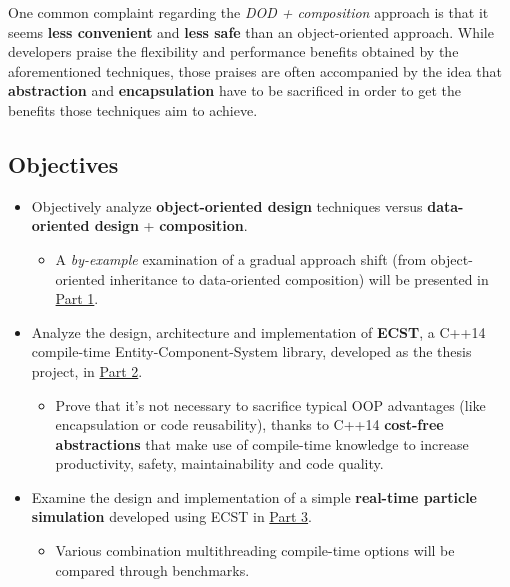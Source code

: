 \documentclass[oneside, 12pt, a4paper, openany]{book}
\providecommand{\tightlist}{%
  \setlength{\itemsep}{0pt}\setlength{\parskip}{0pt}}
\begin{document}
One common complaint regarding the \emph{DOD + composition} approach is
that it seems \textbf{less convenient} and \textbf{less safe} than an
object-oriented approach. While developers praise the flexibility and
performance benefits obtained by the aforementioned techniques, those
praises are often accompanied by the idea that \textbf{abstraction} and
\textbf{encapsulation} have to be sacrificed in order to get the
benefits those techniques aim to achieve.

\subsection{Objectives}\label{objectives}

\begin{itemize}
\item
  Objectively analyze \textbf{object-oriented design} techniques versus
  \textbf{data-oriented design} + \textbf{composition}.

  \begin{itemize}
  \tightlist
  \item
    A \emph{by-example} examination of a gradual approach shift (from
    object-oriented inheritance to data-oriented composition) will be
    presented in \protect\hyperlink{ecs_part_overview}{Part 1}.
  \end{itemize}
\item
  Analyze the design, architecture and implementation of \textbf{ECST},
  a C++14 compile-time Entity-Component-System library, developed as the
  thesis project, in \protect\hyperlink{part2_ecst}{Part 2}.

  \begin{itemize}
  \tightlist
  \item
    Prove that it's not necessary to sacrifice typical OOP advantages
    (like encapsulation or code reusability), thanks to C++14
    \textbf{cost-free abstractions} that make use of compile-time
    knowledge to increase productivity, safety, maintainability and code
    quality.
  \end{itemize}
\item
  Examine the design and implementation of a simple \textbf{real-time
  particle simulation} developed using ECST in
  \protect\hyperlink{part3_sim}{Part 3}.

  \begin{itemize}
  \tightlist
  \item
    Various combination multithreading compile-time options will be
    compared through benchmarks.
  \end{itemize}
\end{itemize}
\end{document}
